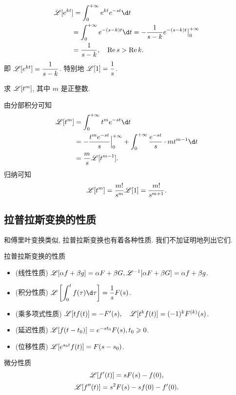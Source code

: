 \begin{solution}
	\begin{align*}
		\msl[e^{kt}]&=\int_0^{+\infty}e^{kt}e^{-st}\d t\\
		&{=\int_0^{+\infty}e^{-(s-k)t}\d t
		=-\frac1{s-k}e^{-(s-k)t}\big|_0^{+\infty}}\\
		&{=\frac1{s-k}, \quad\Re s>\Re k.}
	\end{align*}
	即 \emph{$\mathscr{L}[e^{kt}]=\dfrac1{s-k}$}.
	特别地 \emph{$\mathscr{L}[1]=\dfrac1s$}.
\end{solution}

\begin{example}
	求 $\mathscr{L}[t^m]$, 其中 $m$ 是正整数.
\end{example}

\begin{solution}
	由分部积分可知
	\begin{align*}
		\msl[t^m]&=\int_0^{+\infty}t^me^{-st}\d t\\
		&=-\frac{t^me^{-st}}s\Big|_0^{+\infty}+\int_0^{+\infty}\frac{e^{-st}}s\cdot mt^{m-1}\d t\\
		&=\frac ms\msl[t^{m-1}].
	\end{align*}
	归纳可知
		\[\mathscr{L}[t^m]=\frac{m!}{s^m}\mathscr{L}[1]=\frac{m!}{s^{m+1}}.\]
\end{solution}

\subsection{拉普拉斯变换的性质}

和傅里叶变换类似, 拉普拉斯变换也有着各种性质. 我们不加证明地列出它们.

\begin{theorem}{拉普拉斯变换的性质}
	\begin{itemize}
		\item (线性性质) $\mathscr{L}[\alpha f+\beta g]=\alpha F+\beta G, \mathscr{L}^{-1}[\alpha F+\beta G]=\alpha f+\beta g$.
		\item (积分性质) $\displaystyle\msl\left[\int_0^t f(\tau)\d\tau\right]=\frac 1s F(s)$.
		\item (乘多项式性质) $\mathscr{L}[tf(t)]=-F'(s),\quad\mathscr{L}[t^kf(t)]=(-1)^kF^{(k)}(s)$.
		\item (延迟性质) $\mathscr{L}[f(t-t_0)]=e^{-st_0}F(s), t_0\geqslant 0$.
		\item (位移性质) $\mathscr{L}[e^{s_0t}f(t)]=F(s-s_0)$.
	\end{itemize}
\end{theorem}

\begin{theorem}{微分性质}
	\[\mathscr{L}[f'(t)]=sF(s)-f(0),\]
	\[\mathscr{L}[f''(t)]=s^2F(s)-sf(0)-f'(0).\]
\end{theorem}

